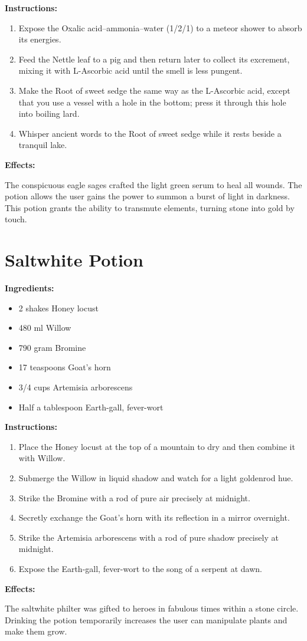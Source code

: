 \documentclass{article}
\begin{document}
\textbf{Instructions:}

\begin{enumerate}
  \item Expose the Oxalic acid--ammonia--water (1/2/1) to a meteor shower to absorb its energies.
  \item Feed the Nettle leaf to a pig and then return later to collect its excrement, mixing it with L-Ascorbic acid until the smell is less pungent.
  \item Make the Root of sweet sedge the same way as the L-Ascorbic acid, except that you use a vessel with a hole in the bottom; press it through this hole into boiling lard.
  \item Whisper ancient words to the Root of sweet sedge while it rests beside a tranquil lake.
\end{enumerate}

\textbf{Effects:}

The conspicuous eagle sages crafted the light green serum to heal all wounds. The potion allows the user gains the power to summon a burst of light in darkness. This potion grants the ability to transmute elements, turning stone into gold by touch.

\newpage
\section*{Saltwhite Potion}

\textbf{Ingredients:}

\begin{itemize}
  \item 2 shakes Honey locust
  \item 480 ml Willow
  \item 790 gram Bromine
  \item 17 teaspoons Goat's horn
  \item 3/4 cups Artemisia arborescens
  \item Half a tablespoon Earth-gall, fever-wort
\end{itemize}

\textbf{Instructions:}

\begin{enumerate}
  \item Place the Honey locust at the top of a mountain to dry and then combine it with Willow.
  \item Submerge the Willow in liquid shadow and watch for a light goldenrod hue.
  \item Strike the Bromine with a rod of pure air precisely at midnight.
  \item Secretly exchange the Goat's horn with its reflection in a mirror overnight.
  \item Strike the Artemisia arborescens with a rod of pure shadow precisely at midnight.
  \item Expose the Earth-gall, fever-wort to the song of a serpent at dawn.
\end{enumerate}

\textbf{Effects:}

The saltwhite philter was gifted to heroes in fabulous times within a stone circle. Drinking the potion temporarily increases the user can manipulate plants and make them grow.
\end{document}
